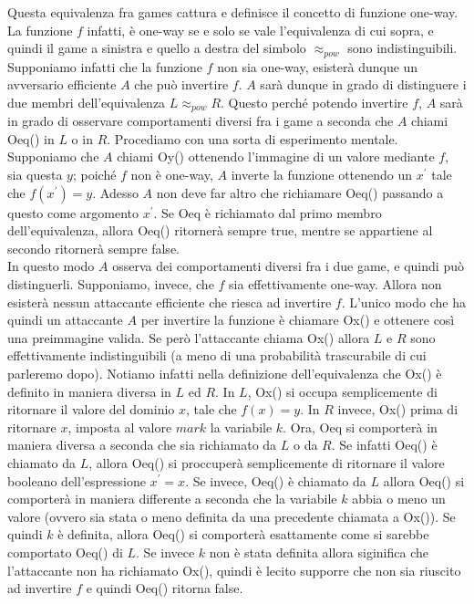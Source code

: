 \documentclass[a4paper,openright,twoside,12pt]{report}
\begin{document}
Questa equivalenza fra games cattura e definisce il concetto di funzione one-way. La funzione $f$ infatti, \`e one-way se e solo se vale l'equivalenza di cui sopra, 
e quindi il game a sinistra e quello a destra del simbolo \textbf{$\approx _{pow}$} sono indistinguibili.
Supponiamo infatti che la funzione $f$ non sia one-way, esister\`a dunque un avversario efficiente $A$ 
che pu\`o invertire $f$. $A$ sar\`a dunque in grado di distinguere i due membri dell'equivalenza $L \approx_{pow} R$. 
Questo perch\'e potendo invertire $f$, $A$ sar\`a in grado di osservare comportamenti diversi fra i game a seconda che $A$ chiami Oeq() in $L$ o in $R$.
Procediamo con una sorta di esperimento mentale.\\ 
Supponiamo che $A$ chiami Oy() ottenendo l'immagine di un valore mediante $f$, sia questa $y$; poich\'e $f$ non \`e one-way, 
$A$ inverte la funzione ottenendo un $x^{'}$ tale che $f(x^{'})= y$.
Adesso $A$ non deve far altro che richiamare Oeq() passando a questo come argomento $x^{'}$. Se Oeq \`e richiamato dal primo membro dell'equivalenza, 
allora Oeq()  ritorner\`a sempre true, mentre se appartiene al secondo ritorner\`a sempre false.\\
In questo modo $A$ osserva dei comportamenti diversi fra i due game, e quindi pu\`o distinguerli. 
Supponiamo, invece, che $f$ sia effettivamente one-way. Allora non esister\`a nessun attaccante efficiente che riesca ad invertire $f$.
L'unico modo che ha quindi un attaccante $A$ per invertire la funzione \`e chiamare Ox() e ottenere cos\`i una preimmagine valida. 
Se però l'attaccante chiama Ox() allora $L$ e $R$ sono effettivamente indistinguibili (a meno di una probabilit\`a trascurabile di cui parleremo dopo).
Notiamo infatti nella definizione dell'equivalenza che Ox() \`e definito in maniera diversa in $L$ ed $R$.
In $L$, Ox() si occupa semplicemente di ritornare il valore del dominio $x$, tale che $f(x)=y$. 
In $R$ invece, Ox() prima di ritornare $x$, imposta al valore $mark$ la variabile $k$.
Ora, Oeq si comporter\`a in maniera diversa a seconda che sia richiamato da $L$ o da $R$.
Se infatti Oeq() \`e chiamato da $L$, allora Oeq() si proccuper\`a semplicemente di ritornare il valore booleano dell'espressione $x^{'}=x$.
Se invece, Oeq() \`e chiamato da $L$ allora Oeq() si comporter\`a in maniera differente a seconda che la variabile $k$ abbia o meno un valore 
(ovvero sia stata o meno definita da una precedente chiamata a Ox()). Se quindi $k$ \`e definita, allora Oeq() si comporter\`a esattamente come si sarebbe comportato Oeq() di $L$.
Se invece $k$ non \`e stata definita allora siginifica che l'attaccante non ha richiamato Ox(), quindi \`e lecito supporre che non sia riuscito ad invertire $f$ e quindi Oeq() ritorna false.\\
\end{document}

